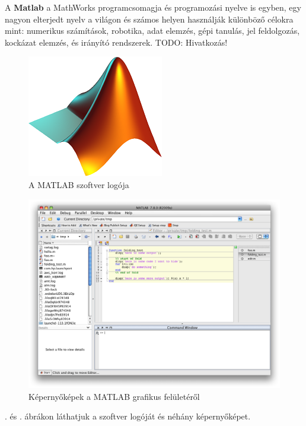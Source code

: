 
A \textbf{Matlab} a MathWorks programcsomagja és programozási nyelve is
egyben, egy nagyon elterjedt nyelv a világon és számos helyen használják
különböző célokra mint: numerikus számítások, robotika, adat elemzés,
gépi tanulás, jel feldolgozás, kockázat elemzés, és irányító rendszerek.
TODO: Hivatkozás! %

\begin{figure}[h!]
\centering
\includegraphics{img/Matlab_Logo.png}
\caption{A MATLAB szoftver logója}
\label{fig:matlab-logo}
\end{figure}

\begin{figure}[h!]
\centering
\includegraphics[width=\textwidth]{img/matlab_screenshots.png}
\caption{Képernyőképek a MATLAB grafikus felületéről}
\label{fig:matlab-screenshots}
\end{figure}

. és . ábrákon láthatjuk a szoftver logóját és néhány képernyőképet.

